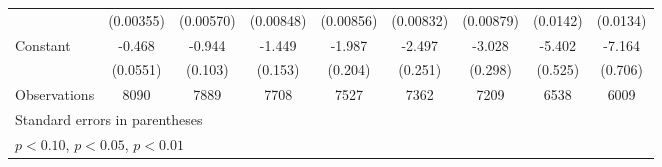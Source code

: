 \begin{table}[htbp]
\begin{tabular}{l*{8}{c}}
                    &   (0.00355)         &   (0.00570)         &   (0.00848)         &   (0.00856)         &   (0.00832)         &   (0.00879)         &    (0.0142)         &    (0.0134)         \\
[1em]
Constant            &      -0.468\sym{***}&      -0.944\sym{***}&      -1.449\sym{***}&      -1.987\sym{***}&      -2.497\sym{***}&      -3.028\sym{***}&      -5.402\sym{***}&      -7.164\sym{***}\\
                    &    (0.0551)         &     (0.103)         &     (0.153)         &     (0.204)         &     (0.251)         &     (0.298)         &     (0.525)         &     (0.706)         \\
\hline
Observations        &        8090         &        7889         &        7708         &        7527         &        7362         &        7209         &        6538         &        6009         \\
\hline\hline
\multicolumn{9}{l}{\footnotesize Standard errors in parentheses}\\
\multicolumn{9}{l}{\footnotesize \sym{*} \(p<0.10\), \sym{**} \(p<0.05\), \sym{***} \(p<0.01\)}\\
\end{tabular}
\end{table}

